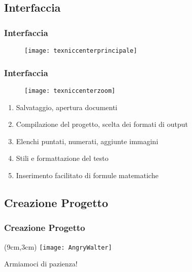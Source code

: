 \subsection{Interfaccia}
\begin{frame}
  \frametitle{Interfaccia}
  
  \begin{figure}
   \centering
   \texttt{[image: texniccenterprincipale]}
  \end{figure}
\end{frame}


\begin{frame}
  \frametitle{Interfaccia}
  
  \begin{figure}
   \centering
   \texttt{[image: texniccenterzoom]}
  \end{figure}
  
  \begin{enumerate}
   \item Salvataggio, apertura documenti
   \item Compilazione del progetto, scelta dei formati di output
   \item Elenchi puntati, numerati, aggiunte immagini
   \item Stili e formattazione del testo
   \item Inserimento facilitato di formule matematiche
  \end{enumerate}

\end{frame}

\subsection{Creazione Progetto}
\begin{frame}
  \frametitle{Creazione Progetto}
  
    \begin{textblock*}{5cm}(9cm,3cm)
      \texttt{[image: AngryWalter]}
    \end{textblock*}
    
    \huge Armiamoci di pazienza!
\end{frame}
